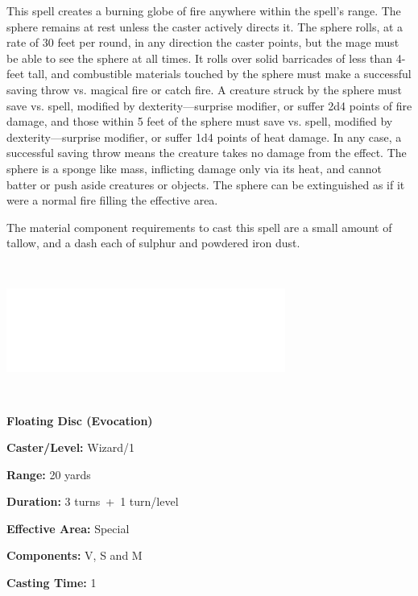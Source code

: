 \begin{multicols}{2}
This spell creates a burning globe of fire anywhere within the spell's range.  The sphere remains at rest unless the caster actively directs it.  The sphere rolls, at a rate of 30 feet per round, in any direction the caster points, but the mage must be able to see the sphere at all times.  It rolls over solid barricades of less than 4-feet tall, and combustible materials touched by the sphere must make a successful saving throw vs. magical fire or catch fire.  A creature struck by the sphere must save vs. spell, modified by dexterity---surprise modifier, or suffer 2d4 points of fire damage, and those within 5 feet of the sphere must save vs. spell, modified by dexterity---surprise modifier, or suffer 1d4 points of heat damage.  In any case, a successful saving throw means the creature takes no damage from the effect.  The sphere is a sponge like mass, inflicting damage only via its heat, and cannot batter or push aside creatures or objects. The sphere can be extinguished as if it were a normal fire filling the effective area. 

The material component requirements to cast this spell are a small amount of tallow, and a dash each of sulphur and powdered iron dust.

\noindent\includegraphics[width=3.6in, height=1.75in]{testblock.pdf}

\vspace{1em}

\noindent
\begin{minipage}{\columnwidth}

\noindent \textbf{Floating Disc (Evocation)}

\noindent \textbf{Caster/Level:} Wizard/1

\noindent \textbf{Range:} 20 yards

\noindent \textbf{Duration:} 3 turns~+~1 turn/level

\noindent \textbf{Effective Area:} Special

\noindent \textbf{Components:} V, S and M

\noindent \textbf{Casting Time:} 1


\end{minipage}
\end{multicols}
